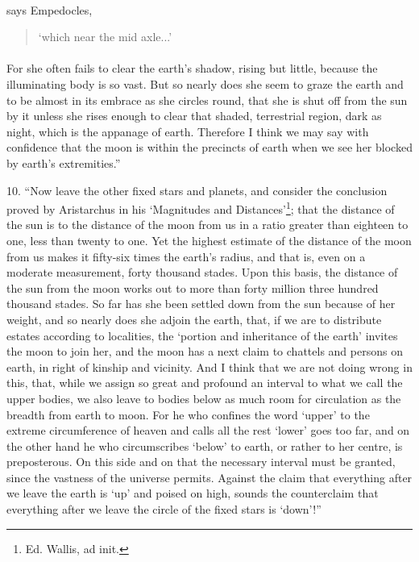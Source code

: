 \documentclass[a4paper, 11pt, oneside, polutonikogreek, english]{article}
\begin{document}
\paragraph{}
says Empedocles,
\begin{quotation}
`which near the mid axle...'
\end{quotation}
\paragraph{}
For she often fails to clear the earth's shadow, rising but little, because the illuminating body is so vast. But so nearly does she seem to graze the earth and to be almost in its embrace as she circles round, that she is shut off from the sun by it unless she rises enough to clear that shaded, terrestrial region, dark as night, which is the appanage of earth. Therefore I think we may say with confidence that the moon is within the precincts of earth when we see her blocked by earth's extremities.''

10. ``Now leave the other fixed stars and planets, and consider the conclusion proved by Aristarchus in his `Magnitudes and Distances'\footnote{Ed. Wallis, ad init.}; that the distance of the sun is to the distance of the moon from us in a ratio greater than eighteen to one, less than twenty to one. Yet the highest estimate of the distance of the moon from us makes it fifty-six times the earth's radius, and that is, even on a moderate measurement, forty thousand stades. Upon this basis, the distance of the sun from the moon works out to more than forty million three hundred thousand stades. So far has she been settled down from the sun because of her weight, and so nearly does she adjoin the earth, that, if we are to distribute estates according to localities, the `portion and inheritance of the earth' invites the moon to join her, and the moon has a next claim to chattels and persons on earth, in right of kinship and vicinity. And I think that we are not doing wrong in this, that, while we assign so great and profound an interval to what we call the upper bodies, we also leave to bodies below as much room for circulation as the breadth from earth to moon. For he who confines the word `upper' to the extreme circumference of heaven and calls all the rest `lower' goes too far, and on the other hand he who circumscribes `below' to earth, or rather to her centre, is preposterous. On this side and on that the necessary interval must be granted, since the vastness of the universe permits. Against the claim that everything after we leave the earth is `up' and poised on high, sounds the counterclaim that everything after we leave the circle of the fixed stars is `down'!''
\end{document}
